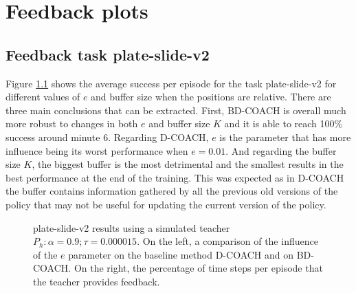 \chapter{Feedback plots}
\label{appendix:feedback-plots}




\section{Feedback task plate-slide-v2}
\label{section:Feedback plots}




Figure \ref{fig:results_plate_slide_buffer_e} shows the average success per episode for the task plate-slide-v2 for different values of $e$ and buffer size when the positions are relative. There are three main conclusions that can be extracted. First, BD-COACH is overall much more robust to changes in both $e$ and buffer size $K$ and it is able to reach 100\% success around minute 6. Regarding D-COACH, $e$ is the parameter that has more influence being its worst performance when $e=0.01$. And regarding the buffer size $K$, the biggest buffer is the most detrimental and the smallest results in the best performance at the end of the training.
This was expected as in D-COACH the buffer contains information gathered by all the previous old versions of the policy that may not be useful for updating the current version of the policy.

 \begin{figure}[H]
  \centering
   \hfill
  \caption{plate-slide-v2 results using a simulated teacher $P_h: \alpha = 0.9; \tau =  0.000015$. On the left, a comparison of the influence of the $e$ parameter on the baseline method D-COACH and on BD-COACH. On the right, the percentage of time steps per episode that the teacher  provides feedback.}
  \label{fig:results_plate_slide_buffer_e}
\end{figure}



